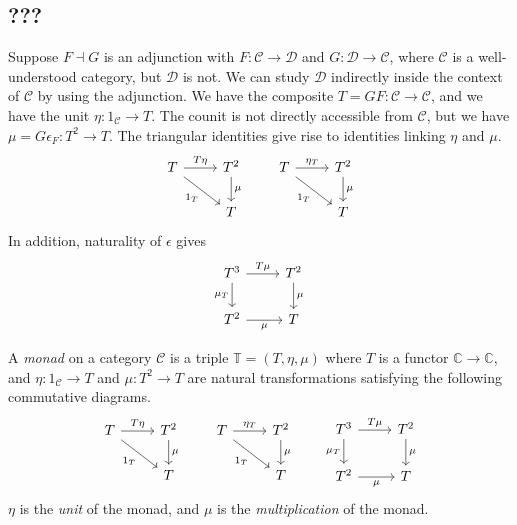 \subsection{???}
Suppose \( F \dashv G \) is an adjunction with \( F : \mathcal C \to \mathcal D \) and \( G : \mathcal D \to \mathcal C \), where \( \mathcal C \) is a well-understood category, but \( \mathcal D \) is not.
We can study \( \mathcal D \) indirectly inside the context of \( \mathcal C \) by using the adjunction.
We have the composite \( T = GF : \mathcal C \to \mathcal C \), and we have the unit \( \eta : 1_{\mathcal C} \to T \).
The counit is not directly accessible from \( \mathcal C \), but we have \( \mu = G\epsilon_F : T^2 \to T \).
The triangular identities give rise to identities linking \( \eta \) and \( \mu \).
\[\begin{tikzcd}
	T & {T^2} \\
	& T
	\arrow["T\eta", from=1-1, to=1-2]
	\arrow["\mu", from=1-2, to=2-2]
	\arrow["{1_T}"', from=1-1, to=2-2]
\end{tikzcd}\quad\quad\begin{tikzcd}
	T & {T^2} \\
	& T
	\arrow["{\eta_T}", from=1-1, to=1-2]
	\arrow["\mu", from=1-2, to=2-2]
	\arrow["{1_T}"', from=1-1, to=2-2]
\end{tikzcd}\]
In addition, naturality of \( \epsilon \) gives
\[\begin{tikzcd}
	{T^3} & {T^2} \\
	{T^2} & T
	\arrow["T\mu", from=1-1, to=1-2]
	\arrow["\mu", from=1-2, to=2-2]
	\arrow["{\mu_T}"', from=1-1, to=2-1]
	\arrow["\mu"', from=2-1, to=2-2]
\end{tikzcd}\]
\begin{definition}
    A \emph{monad} on a category \( \mathcal C \) is a triple \( \mathbb T = (T, \eta, \mu) \) where \( T \) is a functor \( \mathbb C \to \mathbb C \), and \( \eta : 1_{\mathcal C} \to T \) and \( \mu : T^2 \to T \) are natural transformations satisfying the following commutative diagrams.
    \[\begin{tikzcd}
        T & {T^2} \\
        & T
        \arrow["T\eta", from=1-1, to=1-2]
        \arrow["\mu", from=1-2, to=2-2]
        \arrow["{1_T}"', from=1-1, to=2-2]
    \end{tikzcd}\quad\quad\begin{tikzcd}
        T & {T^2} \\
        & T
        \arrow["{\eta_T}", from=1-1, to=1-2]
        \arrow["\mu", from=1-2, to=2-2]
        \arrow["{1_T}"', from=1-1, to=2-2]
    \end{tikzcd}\quad\quad\begin{tikzcd}
        {T^3} & {T^2} \\
        {T^2} & T
        \arrow["T\mu", from=1-1, to=1-2]
        \arrow["\mu", from=1-2, to=2-2]
        \arrow["{\mu_T}"', from=1-1, to=2-1]
        \arrow["\mu"', from=2-1, to=2-2]
    \end{tikzcd}\]
    \( \eta \) is the \emph{unit} of the monad, and \( \mu \) is the \emph{multiplication} of the monad.
\end{definition}
